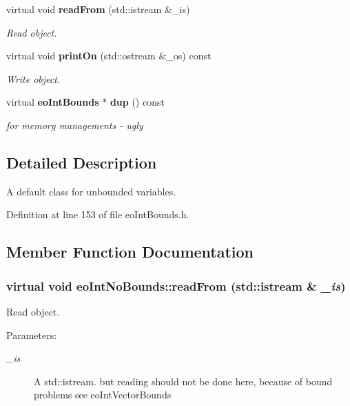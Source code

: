 \begin{CompactItemize}
\item 
virtual void {\bf read\-From} (std::istream \&\_\-is)
\begin{CompactList}\small\item\em Read object. \item\end{CompactList}\item 
virtual void {\bf print\-On} (std::ostream \&\_\-os) const 
\begin{CompactList}\small\item\em Write object. \item\end{CompactList}\item 
virtual {\bf eo\-Int\-Bounds} $\ast$ {\bf dup} () const \label{classeo_int_no_bounds_a15}

\begin{CompactList}\small\item\em for memory managements - ugly \item\end{CompactList}\end{CompactItemize}


\subsection{Detailed Description}
A default class for unbounded variables. 



Definition at line 153 of file eo\-Int\-Bounds.h.

\subsection{Member Function Documentation}
\subsubsection{\setlength{\rightskip}{0pt plus 5cm}virtual void eo\-Int\-No\-Bounds::read\-From (std::istream \& {\em \_\-is})\hspace{0.3cm}{\tt  [inline, virtual]}}\label{classeo_int_no_bounds_a13}


Read object. 

\begin{Desc}
\item[Parameters:]
\begin{description}
\item[{\em \_\-is}]A std::istream. but reading should not be done here, because of bound problems see eo\-Int\-Vector\-Bounds \end{description}
\end{Desc}


